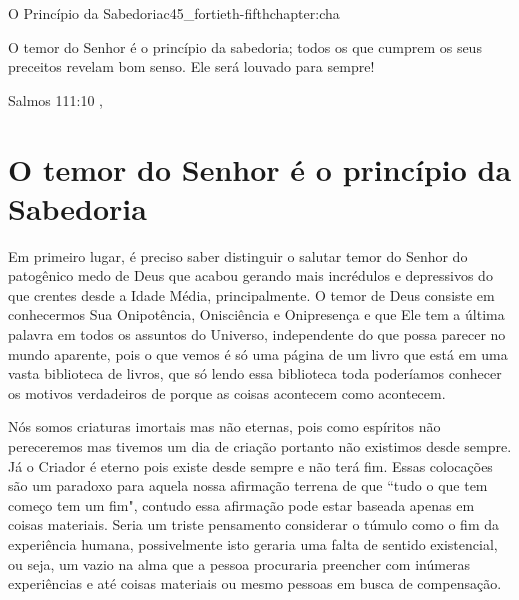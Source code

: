\begin{chapterpage}{O Princípio da Sabedoria}{c45_fortieth-fifthchapter:cha}
 
\begin{myquotation}O temor do Senhor é o princípio da sabedoria; todos os que cumprem os seus preceitos revelam bom senso. Ele será louvado para sempre!
\par\vspace*{15mm}
\mbox{}\hfill \emdash{}Salmos 111:10
, %
\par\end{myquotation}

\end{chapterpage}



\section{O temor do Senhor é o princípio da Sabedoria}\label{c1_basicformatting:sec}

\emdash{}Em primeiro lugar, é preciso saber distinguir o salutar temor do Senhor do patogênico medo de Deus que acabou gerando mais incrédulos e depressivos do que crentes desde a Idade Média, principalmente. O temor de Deus consiste em conhecermos Sua Onipotência, Onisciência e Onipresença e que Ele tem a última palavra em todos os assuntos do Universo, independente do que possa parecer no mundo aparente, pois o que vemos é só uma página de um livro que está em uma vasta biblioteca de livros, que só lendo essa biblioteca toda poderíamos conhecer os motivos verdadeiros de porque as coisas acontecem como acontecem.

\emdash{}Nós somos criaturas imortais mas não eternas, pois como espíritos não pereceremos mas tivemos um dia de criação portanto não existimos desde sempre. Já o Criador é eterno pois existe desde sempre e não terá fim. Essas colocações são um paradoxo para aquela nossa afirmação terrena de que ``tudo o que tem começo tem um fim", contudo essa afirmação pode estar baseada apenas em coisas materiais. Seria um triste pensamento considerar o túmulo como o fim da experiência humana, possivelmente isto geraria uma falta de sentido existencial, ou seja, um vazio na alma que a pessoa procuraria preencher com inúmeras experiências e até coisas materiais ou mesmo pessoas em busca de compensação.

